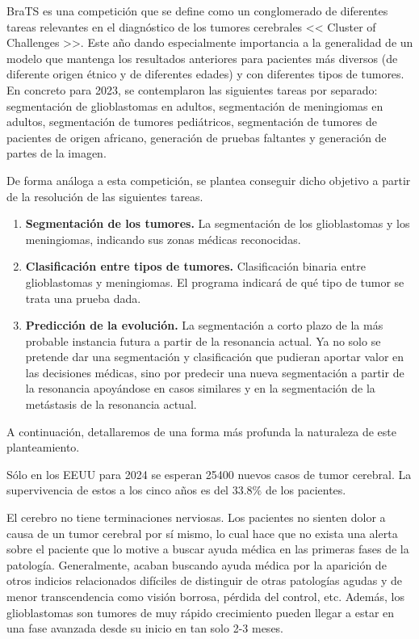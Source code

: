 BraTS es una competición que se define como un conglomerado de diferentes tareas relevantes en el diagnóstico de los tumores cerebrales << Cluster of Challenges >>. Este año dando especialmente importancia a la generalidad de un modelo que mantenga los resultados anteriores para pacientes más diversos (de diferente origen étnico y de diferentes edades) y con diferentes tipos de tumores. En concreto para 2023, se contemplaron las siguientes tareas por separado: segmentación de glioblastomas en adultos, segmentación de meningiomas en adultos, segmentación de tumores pediátricos, segmentación de tumores de pacientes de origen africano, generación de pruebas faltantes y generación de partes de la imagen.

De forma análoga a esta competición, se plantea conseguir dicho objetivo a partir de la resolución de las siguientes tareas.

\begin{enumerate}
	\item \textbf{Segmentación de los tumores.} 
	La segmentación de los glioblastomas y los meningiomas, indicando sus zonas médicas reconocidas.
	\item \textbf{Clasificación entre tipos de tumores.} Clasificación binaria entre glioblastomas y meningiomas. El programa indicará de qué tipo de tumor se trata una prueba dada.
	\item \textbf{Predicción de la evolución.} La segmentación a corto plazo de la más probable instancia futura a partir de la resonancia actual. Ya no solo se pretende dar una segmentación y clasificación que pudieran aportar valor en las decisiones médicas, sino por predecir una nueva segmentación a partir de la resonancia apoyándose en casos similares y en la segmentación de la metástasis de la resonancia actual.
\end{enumerate}

A continuación, detallaremos de una forma más profunda la naturaleza de este planteamiento.

Sólo en los EEUU para 2024 se esperan 25400 nuevos casos de tumor cerebral. La supervivencia de estos a los cinco años es del $33.8 \%$ de los pacientes. \cite{cancerorg}

El cerebro no tiene terminaciones nerviosas. Los pacientes no sienten dolor a causa de un tumor cerebral por sí mismo, lo cual hace que no exista una alerta sobre el paciente que lo motive a buscar ayuda médica en las primeras fases de la patología. Generalmente, acaban buscando ayuda médica por la aparición de otros indicios relacionados difíciles de distinguir de otras patologías agudas y de menor transcendencia como visión borrosa, pérdida del control, etc. Además, los glioblastomas son tumores de muy rápido crecimiento pueden llegar a estar en una fase avanzada desde su inicio en tan solo 2-3 meses.

